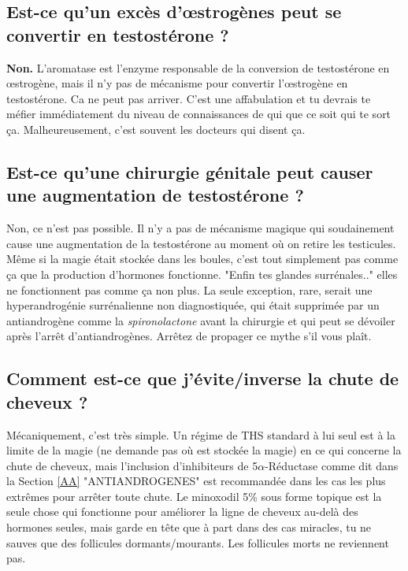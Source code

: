 \documentclass{article}
\begin{document}
\subsection{Est-ce qu'un excès d'œstrogènes peut se convertir en testostérone ?}

\textbf{Non.} L'aromatase est l'enzyme responsable de la conversion de testostérone en œstrogène, mais il n'y pas de mécanisme pour convertir l'œstrogène en testostérone. Ca ne peut pas arriver. C'est une affabulation et tu devrais te méfier immédiatement du niveau de connaissances de qui que ce soit qui te sort ça. Malheureusement, c'est souvent les docteurs qui disent ça.

\subsection{Est-ce qu'une chirurgie génitale peut causer une augmentation de testostérone ?}

Non, ce n'est pas possible. Il n'y a pas de mécanisme magique qui soudainement cause une augmentation de la testostérone au moment où on retire les testicules. Même si la magie était stockée dans les boules, c'est tout simplement pas comme ça que la production d'hormones fonctionne. "Enfin tes glandes surrénales.." elles ne fonctionnent pas comme ça non plus. La seule exception, rare, serait une hyperandrogénie surrénalienne non diagnostiquée, qui était supprimée par un antiandrogène comme la \textit{spironolactone} avant la chirurgie et qui peut se dévoiler après l'arrêt d'antiandrogènes. Arrêtez de propager ce mythe s'il vous plaît. 

\subsection{Comment est-ce que j'évite/inverse la chute de cheveux ?}\label{11-14}

Mécaniquement, c'est très simple. Un régime de THS standard à lui seul est à la limite de la magie (ne demande pas où est stockée la magie) en ce qui concerne la chute de cheveux, mais l'inclusion d'inhibiteurs de 5$\alpha$-Réductase comme dit dans la Section \ref{AA} "ANTIANDROGENES" est recommandée dans les cas les plus extrêmes pour arrêter toute chute. Le minoxodil 5\% sous forme topique est la seule chose qui fonctionne pour améliorer la ligne de cheveux au-delà des hormones seules, mais garde en tête que à part dans des cas miracles, tu ne sauves que des follicules dormants/mourants. Les follicules morts ne reviennent pas.   
\end{document}
